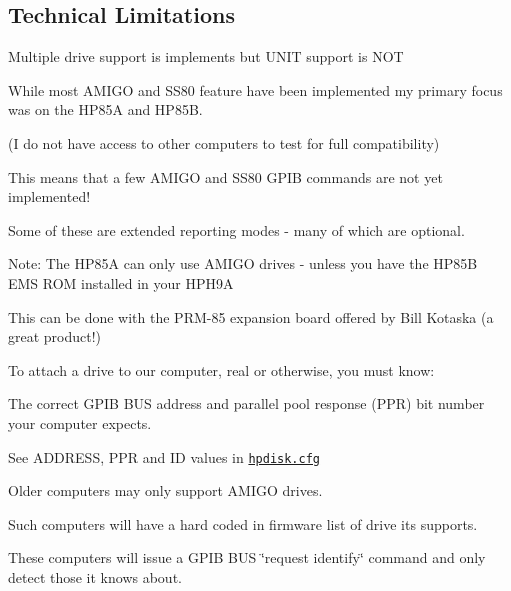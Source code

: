 \subsection*{Technical Limitations}


\begin{DoxyItemize}
\item Multiple drive support is implements but U\+N\+IT support is N\+OT
\item While most A\+M\+I\+GO and S\+S80 feature have been implemented my primary focus was on the H\+P85A and H\+P85B.
\begin{DoxyItemize}
\item (I do not have access to other computers to test for full compatibility)
\item This means that a few A\+M\+I\+GO and S\+S80 G\+P\+IB commands are not yet implemented!
\begin{DoxyItemize}
\item Some of these are extended reporting modes -\/ many of which are optional.
\end{DoxyItemize}
\item Note\+: The H\+P85A can only use A\+M\+I\+GO drives -\/ unless you have the H\+P85B E\+MS R\+OM installed in your H\+P\+H9A
\begin{DoxyItemize}
\item This can be done with the P\+R\+M-\/85 expansion board offered by Bill Kotaska (a great product!)
\end{DoxyItemize}
\end{DoxyItemize}
\item To attach a drive to our computer, real or otherwise, you must know\+:
\begin{DoxyItemize}
\item The correct G\+P\+IB B\+US address and parallel pool response (P\+PR) bit number your computer expects.
\begin{DoxyItemize}
\item See A\+D\+D\+R\+E\+SS, P\+PR and ID values in \href{sdcard.cfg}{\tt hpdisk.\+cfg}
\end{DoxyItemize}
\item Older computers may only support A\+M\+I\+GO drives.
\begin{DoxyItemize}
\item Such computers will have a hard coded in firmware list of drive its supports.
\begin{DoxyItemize}
\item These computers will issue a G\+P\+IB B\+US \char`\"{}request identify\char`\"{} command and only detect those it knows about.

\end{DoxyItemize}
\end{DoxyItemize}
\end{DoxyItemize}
\end{DoxyItemize}
